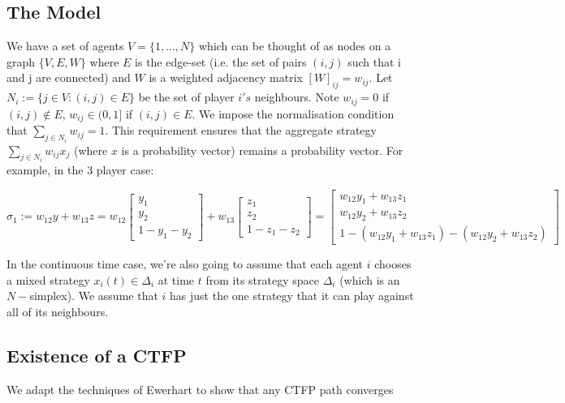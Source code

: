 \documentclass{article}
\theoremstyle{definition}
\begin{document}
	\newpage
	\subsection*{The Model}
	
	We have a set of agents $V = \{1, ..., N \}$ which can be thought of as nodes on a graph $\{V,
	E, W\}$ where $E$ is the edge-set (i.e. the set of pairs $(i, j)$ such that i and j are
	connected) and $W$ is a weighted adjacency matrix $[W]_{ij} = w_{ij}$. Let $N_i := \{j \in V :
	(i, j) \in E\}$ be the set of player $i's$ neighbours. Note $w_{ij} = 0$ if $(i, j) \not\in E$,
	$w_{ij} \in (0, 1]$ if $(i, j) \in E$. We impose the normalisation condition that $\sum_{j \in
	N_i} w_{ij} = 1$. This requirement ensures that the aggregate strategy $\sum_{j \in N_i} w_{ij}
	x_j$ (where $x$ is a probability vector) remains a probability vector. For example, in the 3
	player case:
	
	\begin{equation}
	\sigma_1 := w_{12} y + w_{13} z = 
	w_{12}
	\begin{bmatrix}
	y_1 \\ y_2 \\ 1 - y_1 - y_2
	\end{bmatrix}		
	+ 	w_{13}
	\begin{bmatrix}
	z_1 \\ z_2 \\ 1 - z_1 - z_2
	\end{bmatrix}	= 
	\begin{bmatrix}
	w_{12} y_1 + w_{13} z_1 \\ w_{12} y_2 + w_{13} z_2 \\ 1 - (w_{12} y_1 + w_{13} z_1) - (w_{12} y_2 + w_{13} z_2)
	\end{bmatrix}	
	\end{equation}
	
	In the continuous time case, we're also going to assume that each agent $i$ chooses a mixed strategy $x_i(t) \in \Delta_i$ at time $t$ from its strategy space $\Delta_i$ (which is an $N-$simplex). We assume that $i$ has just the one strategy that it can play against all of its neighbours.
	
	
	\subsection{Existence of a CTFP}
	
	We adapt the techniques of Ewerhart to show that any CTFP path converges 
\end{document}
